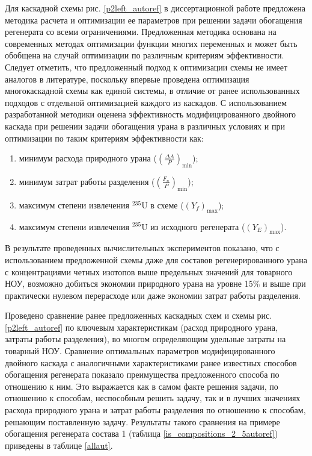 Для каскадной схемы рис. \ref{p2left_autoref} в диссертационной работе предложена методика расчета и оптимизации ее параметров при решении задачи обогащения регенерата со всеми ограничениями. Предложенная методика основана на современных методах оптимизации функции многих переменных и может быть обобщена на случай оптимизации по различным критериям эффективности. Следует отметить, что предложенный подход к оптимизации схемы не имеет аналогов в литературе, поскольку впервые проведена оптимизация многокаскадной схемы как единой системы, в отличие от ранее использованных подходов с отдельной оптимизацией каждого из каскадов. С использованием разработанной методики оценена эффективность модифицированного двойного каскада при решении задачи обогащения урана в различных условиях и при оптимизации по таким критериям эффективности как:

\begin{enumerate}
  \item минимум расхода природного урана ($(\frac{\Delta A}{P})_\text{min}$);
  \item минимум затрат работы разделения ($(\frac{F_n}{P})_\text{min}$);
  \item максимум степени извлечения $^{235}$U в схеме ($(Y_f)_\text{max}$);
  \item максимум степени извлечения $^{235}$U из исходного регенерата ($(Y_{E})_\text{max}$).
\end{enumerate}  

В результате проведенных вычислительных экспериментов показано, что с использованием предложенной схемы даже для составов регенерированного урана с концентрациями четных изотопов выше предельных значений для товарного НОУ, возможно добиться экономии природного урана на уровне 15\% и выше при практически нулевом перерасходе или даже экономии затрат работы разделения. 

Проведено сравнение ранее предложенных каскадных схем и схемы рис. \ref{p2left_autoref} по ключевым характеристикам (расход природного урана, затраты работы разделения), во многом определяющим удельные затраты на товарный НОУ. Сравнение оптимальных параметров модифицированного двойного каскада с аналогичными характеристиками ранее известных способов обогащения регенерата показало преимущества предложенного способа по отношению к ним. Это выражается как в самом факте решения задачи, по отношению к способам, неспособным решить задачу, так и в лучших значениях расхода природного урана и затрат работы разделения по отношению к способам, решающим поставленную задачу. Результаты такого сравнения на примере обогащения регенерата состава 1 (таблица \ref{is_compositions_2_5autoref}) приведены в таблице \ref{allaut}. 

